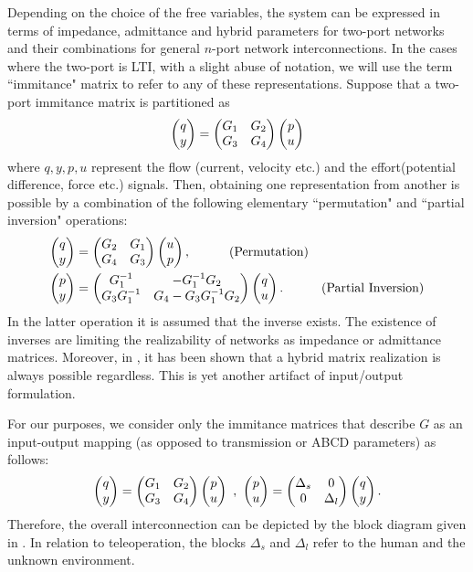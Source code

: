 Depending on the choice of the free variables, the system can be expressed in terms of impedance, admittance 
and hybrid parameters for two-port networks and their combinations for general $n$-port network interconnections. 
In the cases where the two-port is LTI, with a slight abuse of notation, we will use the term ``immitance" matrix to refer to 
any of these representations. Suppose that a two-port immitance matrix is partitioned as
\[
\begin{pmatrix}q\\y\end{pmatrix}=\begin{pmatrix}G_1 &G_2\\G_3 &G_4\end{pmatrix}\begin{pmatrix}p\\u\end{pmatrix}
\]
where $q,y,p,u$ represent the flow (current, velocity etc.) and the effort(potential difference, force etc.) signals. Then, 
obtaining one representation from another is possible by a combination of the following elementary ``permutation" and 
``{partial} inversion" operations:
\begin{align*}
\begin{pmatrix}q\\y\end{pmatrix}&=\begin{pmatrix}G_2 &G_1\\G_4 &G_3\end{pmatrix}\begin{pmatrix}u\\p\end{pmatrix}, \ \ \ \tag{Permutation}\\
\begin{pmatrix}p\\y\end{pmatrix}&=\begin{pmatrix}G_1^{-1} &-G_1^{-1}G_2\\G_3G_1^{-1} &G_4-G_3G_1^{-1}G_2\end{pmatrix}\begin{pmatrix}q\\u\end{pmatrix}. \ \ \ \tag{Partial Inversion}
\end{align*}
In the latter operation it is assumed that the inverse exists. The existence of inverses are limiting the realizability
of networks as impedance or admittance matrices. Moreover, in \cite{andersonHmat}, it has been shown that a hybrid matrix
realization is always possible regardless. This is yet another artifact of input/output formulation. 



For our purposes, we consider only the immitance 
matrices that describe $G$ as an input-output mapping (as opposed to transmission or ABCD parameters) as {follows}:
\begin{equation}
\begin{pmatrix}q\\y\end{pmatrix}=\begin{pmatrix}G_1 &G_2\\G_3 &G_4\end{pmatrix}\begin{pmatrix}p\\u\end{pmatrix} \ , \ \begin{pmatrix}p\\u\end{pmatrix}=\begin{pmatrix}\Delta_s &0\\0&\Delta_l\end{pmatrix} \begin{pmatrix}q\\y\end{pmatrix}.
\end{equation}
Therefore, the overall interconnection can be {depicted} by the block diagram given in . 
In relation to teleoperation, the {blocks} $\Delta_s$ and $\Delta_l$ refer to the human and the unknown environment. 


